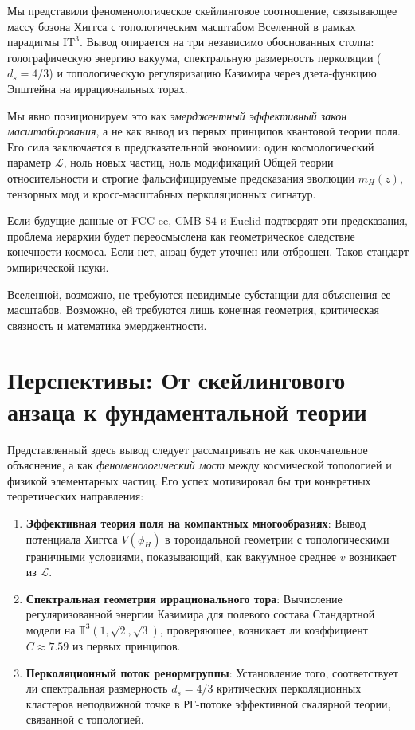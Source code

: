 \documentclass[11pt,a4paper]{article}
\newcommand{\ITthree}{\ensuremath{\mathrm{IT}^3}}
\newcommand{\Ltop}{\ensuremath{\mathcal{L}}}
\begin{document}
Мы представили феноменологическое скейлинговое соотношение, связывающее массу бозона Хиггса с топологическим масштабом Вселенной в рамках парадигмы $\ITthree$. Вывод опирается на три независимо обоснованных столпа: голографическую энергию вакуума, спектральную размерность перколяции ($d_s = 4/3$) и топологическую регуляризацию Казимира через дзета-функцию Эпштейна на иррациональных торах.

Мы явно позиционируем это как \textit{эмерджентный эффективный закон масштабирования}, а не как вывод из первых принципов квантовой теории поля. Его сила заключается в предсказательной экономии: один космологический параметр $\Ltop$, ноль новых частиц, ноль модификаций Общей теории относительности и строгие фальсифицируемые предсказания эволюции $m_H(z)$, тензорных мод и кросс-масштабных перколяционных сигнатур.

Если будущие данные от FCC-ee, CMB-S4 и Euclid подтвердят эти предсказания, проблема иерархии будет переосмыслена как геометрическое следствие конечности космоса. Если нет, анзац будет уточнен или отброшен. Таков стандарт эмпирической науки.

Вселенной, возможно, не требуются невидимые субстанции для объяснения ее масштабов. Возможно, ей требуются лишь конечная геометрия, критическая связность и математика эмерджентности.

\section*{Перспективы: От скейлингового анзаца к фундаментальной теории}

Представленный здесь вывод следует рассматривать не как окончательное объяснение, а как \textit{феноменологический мост} между космической топологией и физикой элементарных частиц. Его успех мотивировал бы три конкретных теоретических направления:

\begin{enumerate}
    \item \textbf{Эффективная теория поля на компактных многообразиях}: Вывод потенциала Хиггса $V(\phi_H)$ в тороидальной геометрии с топологическими граничными условиями, показывающий, как вакуумное среднее $v$ возникает из $\Ltop$.
    
    \item \textbf{Спектральная геометрия иррационального тора}: Вычисление регуляризованной энергии Казимира для полевого состава Стандартной модели на $\mathbb{T}^3(1,\sqrt{2},\sqrt{3})$, проверяющее, возникает ли коэффициент $C \approx 7.59$ из первых принципов.
    
    \item \textbf{Перколяционный поток ренормгруппы}: Установление того, соответствует ли спектральная размерность $d_s = 4/3$ критических перколяционных кластеров неподвижной точке в РГ-потоке эффективной скалярной теории, связанной с топологией.
\end{enumerate}
\end{document}
